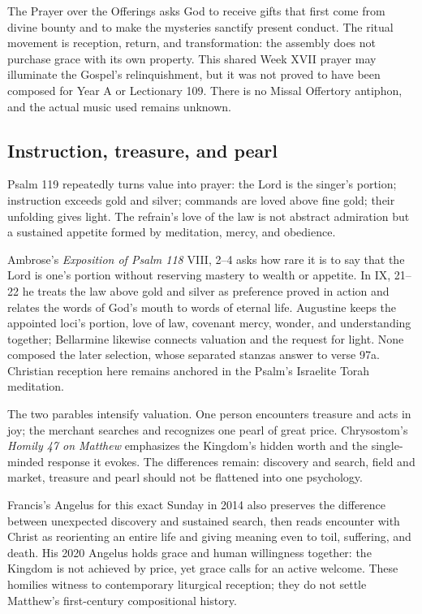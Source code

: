\begin{deepstudy}
The Prayer over the Offerings asks God to receive gifts that first come from divine bounty and to make the mysteries sanctify present conduct. The ritual movement is reception, return, and transformation: the assembly does not purchase grace with its own property. This shared Week XVII prayer may illuminate the Gospel's relinquishment, but it was not proved to have been composed for Year A or Lectionary 109. There is no Missal Offertory antiphon, and the actual music used remains unknown.

\sectionguard
\subsection*{Instruction, treasure, and pearl\enspace{}}

Psalm 119 repeatedly turns value into prayer: the Lord is the singer's portion; instruction exceeds gold and silver; commands are loved above fine gold; their unfolding gives light. The refrain's love of the law is not abstract admiration but a sustained appetite formed by meditation, mercy, and obedience.

Ambrose's \emph{Exposition of Psalm 118} VIII, 2--4 asks how rare it is to say that the Lord is one's portion without reserving mastery to wealth or appetite. In IX, 21--22 he treats the law above gold and silver as preference proved in action and relates the words of God's mouth to words of eternal life. Augustine keeps the appointed loci's portion, love of law, covenant mercy, wonder, and understanding together; Bellarmine likewise connects valuation and the request for light. None composed the later selection, whose separated stanzas answer to verse 97a. Christian reception here remains anchored in the Psalm's Israelite Torah meditation.

The two parables intensify valuation. One person encounters treasure and acts in joy; the merchant searches and recognizes one pearl of great price. Chrysostom's \emph{Homily 47 on Matthew} emphasizes the Kingdom's hidden worth and the single-minded response it evokes. The differences remain: discovery and search, field and market, treasure and pearl should not be flattened into one psychology.

Francis's Angelus for this exact Sunday in 2014 also preserves the difference between unexpected discovery and sustained search, then reads encounter with Christ as reorienting an entire life and giving meaning even to toil, suffering, and death. His 2020 Angelus holds grace and human willingness together: the Kingdom is not achieved by price, yet grace calls for an active welcome. These homilies witness to contemporary liturgical reception; they do not settle Matthew's first-century compositional history.


\end{deepstudy}

